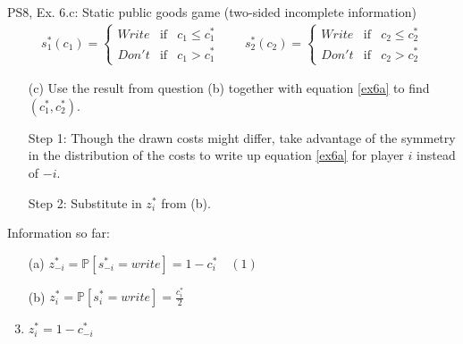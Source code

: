 \begin{frame}{PS8, Ex. 6.c: Static public goods game (two-sided incomplete information)}
    \begin{align*}
      s_1^*(c_1)=\left\{\begin{array}{rcl}
        Write & \text{if} & c_1\leq c_1^*\\
        Don't & \text{if} & c_1>c_1^*
        \end{array}\right.\quad\quad
      s_2^*(c_2)=\left\{\begin{array}{rcl}
        Write & \text{if} & c_2\leq c_2^*\\
        Don't & \text{if} & c_2>c_2^*
        \end{array}\right.
    \end{align*}
    \vspace{-12pt}
    \begin{itemize}
      \item[(c)] Use the result from question (b) together with equation \eqref{ex6a} to find $(c_1^* , c_2^*)$.
    \end{itemize}
    \begin{multicols}{2}
      \begin{itemize}
        \item[Step 1:] Though the drawn costs might differ, take advantage of the symmetry in the distribution of the costs to write up equation \eqref{ex6a} for player $i$ instead of $-i$.
        \item[Step 2:] Substitute in $z_i^*$ from (b).
      \end{itemize}
      \vfill\null\columnbreak
      Information so far:
      \begin{enumerate}
        \item[(a)] $z_{-i}^*=\mathbb{P}[s_{-i}^*=write]=1-c_i^*\quad(1)$
        \item[(b)] $z_i^*=\mathbb{P}[s_i^*=write]=\frac{c_i^*}{2}$
        \item      $z_i^*=1-c_{-i}^*$
      \end{enumerate}
      \vfill\null
    \end{multicols}
\end{frame}
